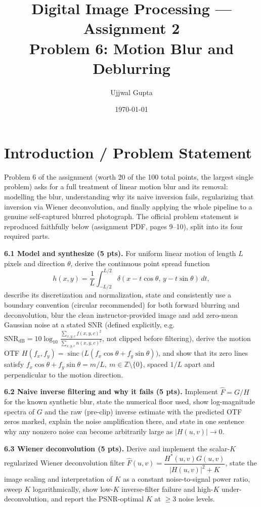 \documentclass[11pt]{article}
\title{\textbf{Digital Image Processing --- Assignment 2}\\[0.3em]\large Problem 6: Motion Blur and Deblurring}
\author{Ujjwal Gupta}
\date{\today}
\begin{document}
\maketitle
\tableofcontents
\vspace{1em}

\section{Introduction / Problem Statement}

Problem 6 of the assignment (worth 20 of the 100 total points, the largest single problem) asks
for a full treatment of linear motion blur and its removal: modelling the blur, understanding
why its naive inversion fails, regularizing that inversion via Wiener deconvolution, and finally
applying the whole pipeline to a genuine self-captured blurred photograph. The official problem
statement is reproduced faithfully below (assignment PDF, pages 9--10), split into its four
required parts.

\textbf{6.1 Model and synthesize (5 pts).} For uniform linear motion of length $L$ pixels and
direction $\theta$, derive the continuous point spread function
\[
h(x,y)=\frac1L\int_{-L/2}^{L/2}\delta(x-t\cos\theta,\,y-t\sin\theta)\,dt,
\]
describe its discretization and normalization, state and consistently use a boundary convention
(circular recommended) for both forward blurring and deconvolution, blur the clean
instructor-provided image and add zero-mean Gaussian noise at a stated SNR (defined explicitly,
e.g.\ $\mathrm{SNR}_{\mathrm{dB}}=10\log_{10}\frac{\sum_{x,y,c}f(x,y,c)^2}{\sum_{x,y,c}n(x,y,c)^2}$,
not clipped before filtering), derive the motion OTF
$H(f_x,f_y)=\operatorname{sinc}\!\big(L(f_x\cos\theta+f_y\sin\theta)\big)$, and show that its
zero lines satisfy $f_x\cos\theta+f_y\sin\theta=m/L,\ m\in\mathbb Z\setminus\{0\}$, spaced $1/L$
apart and perpendicular to the motion direction.

\textbf{6.2 Naive inverse filtering and why it fails (5 pts).} Implement $\hat F=G/H$ for the
known synthetic blur, state the numerical floor used, show log-magnitude spectra of $G$ and the
raw (pre-clip) inverse estimate with the predicted OTF zeros marked, explain the noise
amplification there, and state in one sentence why any nonzero noise can become arbitrarily
large as $|H(u,v)|\to0$.

\textbf{6.3 Wiener deconvolution (5 pts).} Derive and implement the scalar-$K$ regularized
Wiener deconvolution filter
$\hat F(u,v)=\dfrac{H^*(u,v)G(u,v)}{|H(u,v)|^2+K}$, state the image scaling and interpretation
of $K$ as a constant noise-to-signal power ratio, sweep $K$ logarithmically, show low-$K$
inverse-filter failure and high-$K$ under-deconvolution, and report the PSNR-optimal $K$ at
$\ge3$ noise levels.
\end{document}
